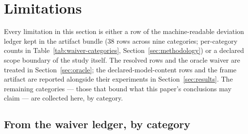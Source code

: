 \section{Limitations}
\label{sec:limitations}

Every limitation in this section is either a row of the machine-readable
deviation ledger kept in the artifact bundle (38 rows across
nine categories; per-category counts in
Table~\ref{tab:waiver-categories}, Section~\ref{sec:methodology}) or a
declared scope boundary of the study itself.
The resolved rows and the oracle waiver are treated in
Section~\ref{sec:oracle}; the declared-model-content rows and the frame
artifact are reported alongside their experiments in
Section~\ref{sec:results}. The remaining categories --- those that bound
what this paper's conclusions may claim --- are collected here, by
category.

\subsection{From the waiver ledger, by category}

